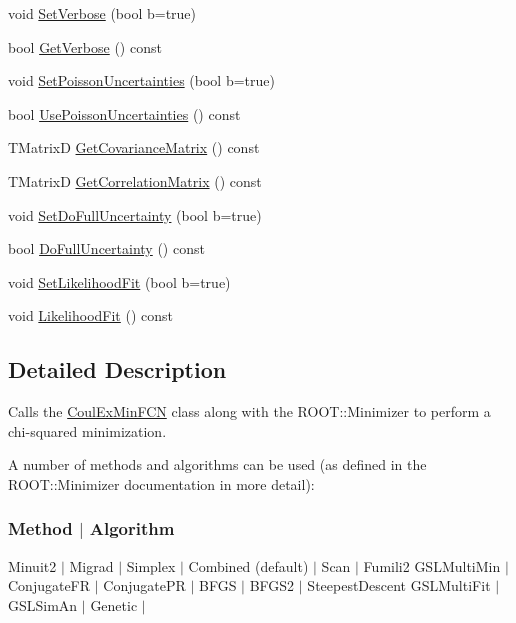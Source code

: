 \begin{DoxyCompactItemize}
\item 
void \hyperlink{classCoulExFitter_aadbcd260ffdc402f24c122a549f08743}{Set\-Verbose} (bool b=true)
\item 
bool \hyperlink{classCoulExFitter_ad7f2ed3a90a161d3d7f8eb6571649da6}{Get\-Verbose} () const 
\item 
void \hyperlink{classCoulExFitter_a9e577fdf18978a59a8a3059522ba7355}{Set\-Poisson\-Uncertainties} (bool b=true)
\item 
bool \hyperlink{classCoulExFitter_af2820d3ab13fcc8df1eaee486d58fb09}{Use\-Poisson\-Uncertainties} () const 
\item 
T\-Matrix\-D \hyperlink{classCoulExFitter_a6d59f4e8c05a18c285972ea722e7a503}{Get\-Covariance\-Matrix} () const 
\item 
T\-Matrix\-D \hyperlink{classCoulExFitter_aeda72e2dee8b0aa45157cb4562f9aab3}{Get\-Correlation\-Matrix} () const 
\item 
void \hyperlink{classCoulExFitter_aacc37bb66234dbd3f235683cad8e1427}{Set\-Do\-Full\-Uncertainty} (bool b=true)
\item 
bool \hyperlink{classCoulExFitter_a4fd09244f82e3af46add6960543524d9}{Do\-Full\-Uncertainty} () const 
\item 
void \hyperlink{classCoulExFitter_a7fa4c365be49eb9f6cf47684ff6b15bc}{Set\-Likelihood\-Fit} (bool b=true)
\item 
void \hyperlink{classCoulExFitter_a42a28d4f2b2f85e8738b74ddb351bf24}{Likelihood\-Fit} () const 
\end{DoxyCompactItemize}


\subsection{Detailed Description}
Calls the \hyperlink{classCoulExMinFCN}{Coul\-Ex\-Min\-F\-C\-N} class along with the R\-O\-O\-T\-::\-Minimizer to perform a chi-\/squared minimization. 

A number of methods and algorithms can be used (as defined in the R\-O\-O\-T\-::\-Minimizer documentation in more detail)\-:

\subsubsection*{Method $|$ Algorithm }

Minuit2 $|$ Migrad $|$ Simplex $|$ Combined (default) $|$ Scan $|$ Fumili2 G\-S\-L\-Multi\-Min $|$ Conjugate\-F\-R $|$ Conjugate\-P\-R $|$ B\-F\-G\-S $|$ B\-F\-G\-S2 $|$ Steepest\-Descent G\-S\-L\-Multi\-Fit $|$ G\-S\-L\-Sim\-An $|$ Genetic $|$

